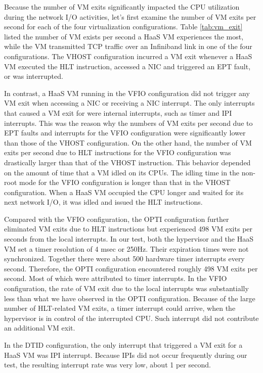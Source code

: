 Because the number of VM exits significantly impacted the CPU
utilization during the network I/O activities, let's first
examine the number of VM exits per second for each of the four
virtualization configurations. Table \ref{tab:vm_exit} listed
the number of VM exists per second a HaaS VM experiences the
most, while the VM transmitted TCP traffic over an Infiniband
link in one of the four configurations. The VHOST
configuration incurred a VM exit whenever a HaaS VM executed
the HLT instruction, accessed a NIC and triggered an EPT
fault, or was interrupted.

In contrast, a HaaS VM running in the VFIO configuration did
not trigger any VM exit when accessing a NIC or receiving a
NIC interrupt. The only interrupts that caused a VM exit for
were internal interrupts, such as timer and IPI interrupts.
This was the reason why the numbers of VM exits per second due
to EPT faults and interrupts for the VFIO configuration were
significantly lower than those of the VHOST configuration. On
the other hand, the number of VM exits per second due to HLT
instructions for the VFIO configuration was drastically larger
than that of the VHOST instruction. This behavior depended on
the amount of time that a VM idled on its CPUs. The idling
time in the non-root mode for the VFIO configuration is longer
than that in the VHOST configuration. When a HaaS VM occupied
the CPU longer and waited for its next network I/O, it was
idled and issued the HLT instructions.

Compared with the VFIO configuration, the OPTI configuration
further eliminated VM exits due to HLT instructions but
experienced 498 VM exits per seconds from the local
interrupts. In our test, both the hypervisor and the HaaS VM
set a timer resolution of 4 msec or 250Hz. Their expiration
times were not synchronized. Together there were about 500
hardware timer interrupts every second. Therefore, the OPTI
configuration encountered roughly 498 VM exits per second.
Most of which were attributed to timer interrupts. In the VFIO
configuration, the rate of VM exit due to the local interrupts
was substantially less than what we have observed in the OPTI
configuration. Because of the large number of HLT-related VM
exits, a timer interrupt could arrive, when the hypervisor is
in control of the interrupted CPU. Such interrupt did not
contribute an additional VM exit.

In the DTID configuration, the only interrupt that triggered a
VM exit for a HaaS VM was IPI interrupt. Because IPIs did not
occur frequently during our test, the resulting interrupt rate
was very low, about 1 per second.

